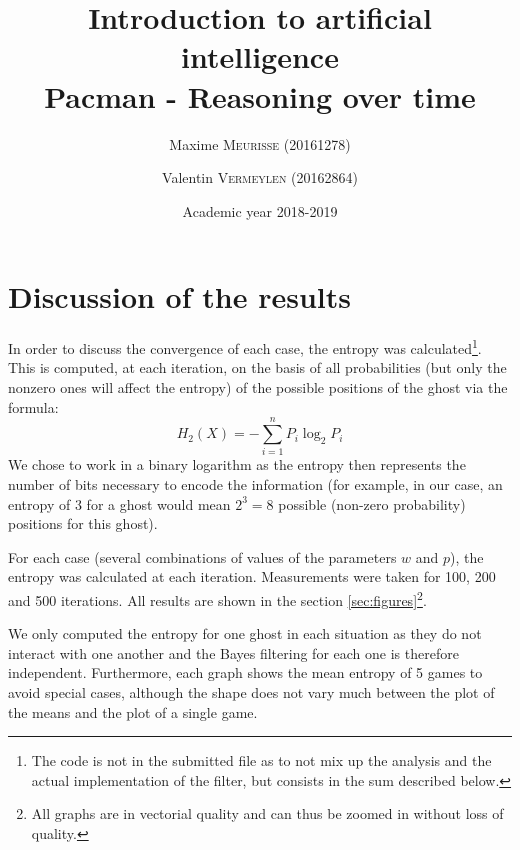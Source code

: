 \documentclass[a4paper, 12pt]{article}
\title{Introduction to artificial intelligence\\Pacman - Reasoning over time}
\author{Maxime \textsc{Meurisse} (20161278)\and Valentin \textsc{Vermeylen} (20162864)}
\date{Academic year 2018-2019}
\begin{document}
    \maketitle
    
    
    \section{Discussion of the results}
    \label{sec:discussion}
    In order to discuss the convergence of each case, the entropy was calculated\footnote{The code is not in the submitted file as to not mix up the analysis and the actual implementation of the filter, but consists in the sum described below.}. This is computed, at each iteration, on the basis of all probabilities (but only the nonzero ones will affect the entropy) of the possible positions of the ghost via the formula:
    \begin{equation}
        H_2\left (X\right ) = -\sum_{i=1}^n P_i\log_2 P_i
    \end{equation}
    We chose to work in a binary logarithm as the entropy then represents the number of bits necessary to encode the information (for example, in our case, an entropy of \num{3} for a ghost would mean \(2^3 = 8\) possible (non-zero probability) positions for this ghost).\par
    For each case (several combinations of values of the parameters \(w\) and \(p\)), the entropy was calculated at each iteration. Measurements were taken for \num{100}, \num{200} and \num{500} iterations. All results are shown in the section \ref{sec:figures}\footnote{All graphs are in vectorial quality and can thus be zoomed in without loss of quality.}.\par
    We only computed the entropy for one ghost in each situation as they do not interact with one another and the Bayes filtering for each one is therefore independent. Furthermore, each graph shows the mean entropy of \num{5} games to avoid special cases, although the shape does not vary much between the plot of the means and the plot of a single game.\par
\end{document}
